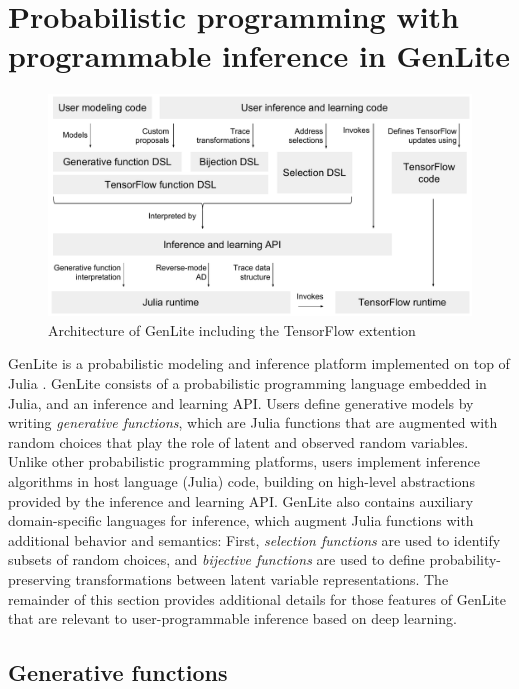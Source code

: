 \section{Probabilistic programming with programmable inference in GenLite}

\begin{figure}[t]
\centering
    \includegraphics[width=\textwidth]{images/genlite-schematic.pdf}
    \caption{Architecture of GenLite including the TensorFlow extention}
    \label{fig:genlite-schematic}
\end{figure}

GenLite is a probabilistic modeling and inference platform implemented on top of Julia \cite{?}.
GenLite consists of a probabilistic programming language embedded in Julia, and an inference and learning API.
Users define generative models by writing \emph{generative functions}, which are Julia functions that are augmented with random choices that play the role of latent and observed random variables.
Unlike other probabilistic programming platforms, users implement inference algorithms in host language (Julia) code, building on high-level abstractions provided by the inference and learning API.
GenLite also contains auxiliary domain-specific languages for inference, which augment Julia functions with additional behavior and semantics:
First, \emph{selection functions} are used to identify subsets of random choices, and \emph{bijective functions} are used to define probability-preserving transformations between latent variable representations.
The remainder of this section provides additional details for those features of GenLite that are relevant to user-programmable inference based on deep learning.

\subsection{Generative functions}

